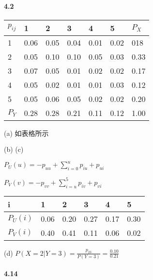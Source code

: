 \documentclass[
]{article}
\author{}
\date{}
\begin{document}
\hypertarget{header-n14}{%
\paragraph{4.2}\label{header-n14}}

\begin{longtable}[]{@{}lllllll@{}}
\toprule
\(p_{ij}\) & 1 & 2 & 3 & 4 & 5 & \(P_X\)\tabularnewline
\midrule
\endhead
1 & 0.06 & 0.05 & 0.04 & 0.01 & 0.02 & 018\tabularnewline
2 & 0.05 & 0.10 & 0.10 & 0.05 & 0.03 & 0.33\tabularnewline
3 & 0.07 & 0.05 & 0.01 & 0.02 & 0.02 & 0.17\tabularnewline
4 & 0.05 & 0.02 & 0.01 & 0.01 & 0.03 & 0.12\tabularnewline
5 & 0.05 & 0.06 & 0.05 & 0.02 & 0.02 & 0.20\tabularnewline
\(P_Y\) & 0.28 & 0.28 & 0.21 & 0.11 & 0.12 & 1.00\tabularnewline
\bottomrule
\end{longtable}

(a) 如表格所示

(b) (c)

\(P_U(u)=-p_{uu}+\sum_{i=0}^{u}p_{iu}+p_{ui}\)

\(P_V(v)=-p_{vv}+\sum_{i=u}^{5}p_{iv}+p_{vi}\)

\begin{longtable}[]{@{}llllll@{}}
\toprule
i & 1 & 2 & 3 & 4 & 5\tabularnewline
\midrule
\endhead
\(P_U(i)\) & 0.06 & 0.20 & 0.27 & 0.17 & 0.30\tabularnewline
\(P_V(i)\) & 0.40 & 0.41 & 0.11 & 0.06 & 0.02\tabularnewline
\bottomrule
\end{longtable}

(d) \(P(X=2|Y=3)=\frac{p_{23}}{P(Y=3)}=\frac{0.10}{0.21}\)

\hypertarget{header-n28}{%
\paragraph{4.14}\label{header-n28}}
\end{document}
